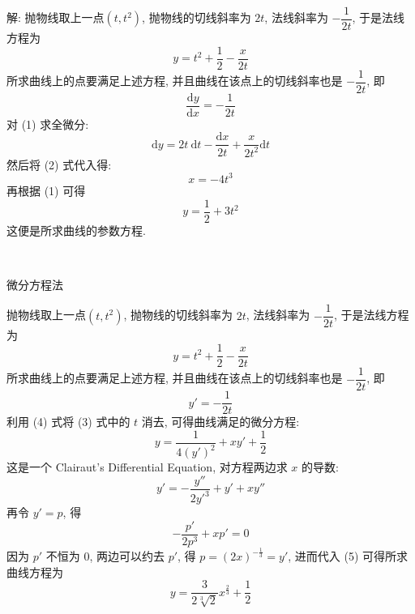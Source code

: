 解: 抛物线取上一点$(t,t^2)$, 抛物线的切线斜率为 $2t$, 法线斜率为 $-\dfrac{1}{2t}$, 于是法线方程为
\[ y = t^2 + \frac{1}{2} - \frac{x}{2t} \tag{1} \]
所求曲线上的点要满足上述方程, 并且曲线在该点上的切线斜率也是 $-\dfrac{1}{2t}$, 即
\[ \frac{\mathrm{d}y}{\mathrm{d}x} = -\frac{1}{2t} \tag{2} \]
对 (1) 求全微分:
\[ \mathrm{d}y = 2t\ \mathrm{d}t - \frac{\mathrm{d}x}{2t} + \frac{x}{2t^2}\mathrm{d}t \]
然后将 (2) 式代入得:
\[ x = -4t^3 \]
再根据 (1) 可得
\[ y = \frac{1}{2} + 3t^2 \]
这便是所求曲线的参数方程.

~

\noindent 微分方程法

抛物线取上一点$(t,t^2)$, 抛物线的切线斜率为 $2t$, 法线斜率为 $-\dfrac{1}{2t}$, 于是法线方程为
\[ y = t^2 + \frac{1}{2} - \frac{x}{2t} \tag{3} \]
所求曲线上的点要满足上述方程, 并且曲线在该点上的切线斜率也是 $-\dfrac{1}{2t}$, 即
\[ y' = -\frac{1}{2t} \tag{4} \]
利用 (4) 式将 (3) 式中的 $t$ 消去, 可得曲线满足的微分方程:
\[ y = \frac{1}{4(y')^2}+xy'+\frac{1}{2} \tag{5} \]
这是一个 Clairaut's Differential Equation, 对方程两边求 $x$ 的导数:
\[ y' = -\frac{y''}{2y'^3} + y' + xy''\]
再令 $y'=p$, 得
\[ -\frac{p'}{2p^3}+xp' = 0 \]
因为 $p'$ 不恒为 $0$, 两边可以约去 $p'$, 得 $p = (2x)^{-\frac{1}{3}} = y'$, 进而代入 (5) 可得所求曲线方程为
\[ y = \frac{3}{2\sqrt[3]{2}}x^{\frac{2}{3}} +  \frac{1}{2} \]


